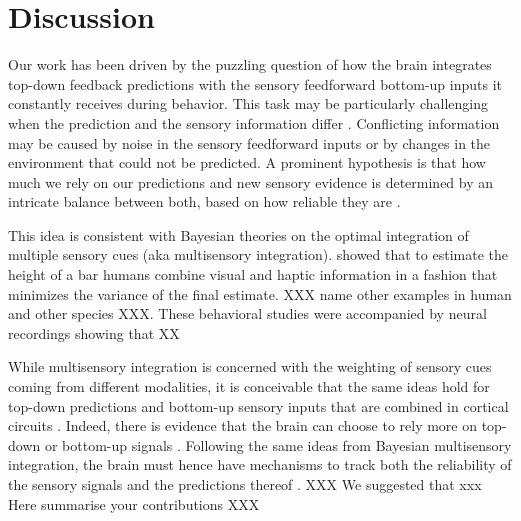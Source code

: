 \documentclass[10pt,a4paper,draft]{article}
\begin{document}
\section*{Discussion}

%
Our work has been driven by the puzzling question of how the brain integrates top-down feedback predictions with the sensory feedforward bottom-up inputs it constantly receives during behavior. This task may be particularly challenging when the prediction and the sensory information differ \citep{han2023behavior}. Conflicting information may be caused by noise in the sensory feedforward inputs or by changes in the environment that could not be predicted. A prominent hypothesis is that how much we rely on our predictions and new sensory evidence is determined by an intricate balance between both, based on how reliable they are \citep[see e.g.][]{yon2021precision}. 

This idea is consistent with Bayesian theories on the optimal integration of multiple sensory cues (aka multisensory integration). \citep{ernst2002humans} showed that to estimate the height of a bar humans combine visual and haptic information in a fashion that minimizes the variance of the final estimate. XXX name other examples in human and other species XXX. These behavioral studies were accompanied by neural recordings showing that XX


While multisensory integration is concerned with the weighting of sensory cues coming from different modalities, it is conceivable that the same ideas hold for top-down predictions and bottom-up sensory inputs that are combined in cortical circuits \citep{yon2021precision}. Indeed, there is evidence that the brain can choose to rely more on top-down or bottom-up signals \citep{pakan2018impact, han2023behavior}. Following the same ideas from Bayesian multisensory integration, the brain must hence have mechanisms to track both the reliability of the sensory signals and the predictions thereof \citep{yon2021precision}.  XXX We suggested that xxx Here summarise your contributions XXX
\end{document}
